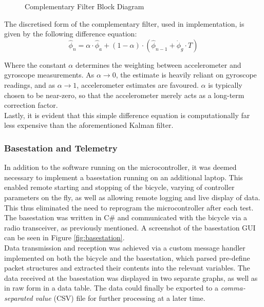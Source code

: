 \begin{figure}[H]
	\centering
    \def\svgwidth{0.75\textwidth}
    
    \caption{Complementary Filter Block Diagram}
	\label{fig:CF}
\end{figure}

The discretised form of the complementary filter, used in implementation, is given by the following difference equation:
\begin{equation*}
\hat{\phi}_n = \alpha \cdot \hat{\phi}_a + (1 - \alpha) \cdot (\hat{\phi}_{n-1} + \dot{\phi}_g \cdot T)
\end{equation*}

Where the constant $\alpha$ determines the weighting between accelerometer and gyroscope measurements. As $\alpha \rightarrow 0$, the estimate is heavily reliant on gyroscope readings, and as $\alpha \rightarrow 1$, accelerometer estimates are favoured. $\alpha$ is typically chosen to be near-zero, so that the accelerometer merely acts as a long-term correction factor. \\

Lastly, it is evident that this simple difference equation is computationally far less expensive than the aforementioned Kalman filter.

\subsubsection{Basestation and Telemetry} \label{basestationsec}
In addition to the software running on the microcontroller, it was deemed necessary to implement a basestation running on an additional laptop. This enabled remote starting and stopping of the bicycle, varying of controller parameters on the fly, as well as allowing remote logging and live display of data. This thus eliminated the need to reprogram the microcontroller after each test. The basestation was written in C\# and communicated with the bicycle via a radio transceiver, as previously mentioned. A screenshot of the basestation GUI can be seen in Figure \ref{fig:basestation}. \\

Data transmission and reception was achieved via a custom message handler implemented on both the bicycle and the basestation, which parsed pre-define packet structures and extracted their contents into the relevant variables. The data received at the basestation was displayed in two separate graphs, as well as in raw form in a data table. The data could finally be exported to a \textit{comma-separated value} (CSV) file for further processing at a later time. \\

